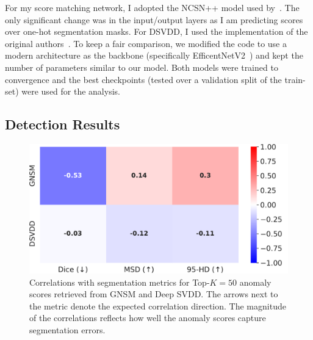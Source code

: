 For my score matching network, I adopted the NCSN++ model used by~\cite{song2020score}. The only significant change was in the input/output layers as I am predicting scores over one-hot segmentation masks. For DSVDD, I used the implementation of the original authors~\cite{pmlr-v80-ruff18a}. To keep a fair comparison, we modified the code to use a modern architecture as the backbone (specifically EfficentNetV2~\cite{tan2021efficientnetv2}) and kept the number of parameters similar to our model. Both models were trained to convergence and the best checkpoints (tested over a validation split of the train-set) were used for the analysis.

\subsection*{Detection Results}
\label{seg_results}

\begin{figure}[htbp]
  \centering
  \includegraphics[width=0.7\columnwidth]{figures/voc_heatmap.pdf}
  \caption{Correlations with segmentation metrics for Top-$K=50$ anomaly scores retrieved from GNSM and Deep SVDD. The arrows next to the metric denote the expected correlation direction. The magnitude of the correlations reflects how well the anomaly scores capture segmentation errors.}
\label{corrs}
\end{figure}

